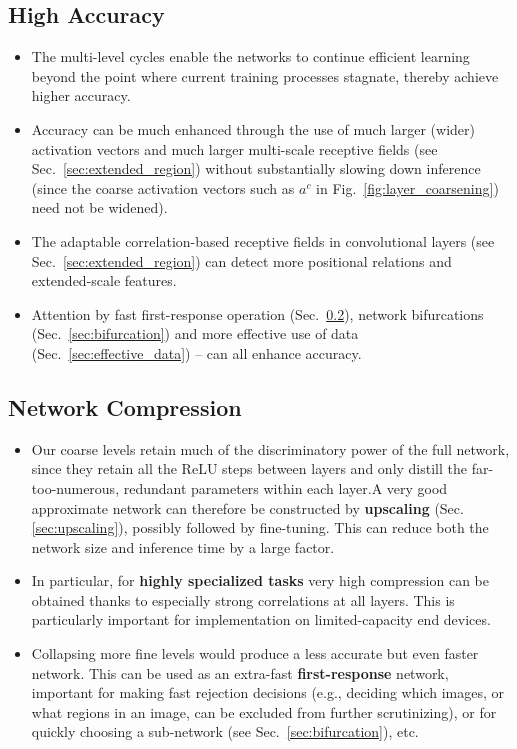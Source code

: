 \documentclass{article} %
\begin{document}
\subsection{High Accuracy}
\label{sec:high_accuracy}
\begin{itemize}
\item The multi-level cycles enable the networks to continue efficient learning beyond the point where current training processes stagnate, thereby achieve higher accuracy.
\item Accuracy can be much enhanced through the use of much larger (wider) activation vectors and much larger multi-scale receptive fields (see Sec.~\ref{sec:extended_region}) without substantially slowing down inference (since the coarse activation vectors such as $a^c$ in Fig.~\ref{fig:layer_coarsening}) need not be widened).
\item The adaptable correlation-based receptive fields in convolutional layers (see Sec.~\ref{sec:extended_region}) can detect more positional relations and extended-scale features.
  \item Attention by fast first-response operation (Sec.~\ref{sec:network_compression}), network bifurcations (Sec.~\ref{sec:bifurcation}) and more effective use of data (Sec.~\ref{sec:effective_data}) -- can all enhance accuracy.
\end{itemize}

\subsection{Network Compression}
\label{sec:network_compression}
\begin{itemize}
\item Our coarse levels retain much of the discriminatory power of the full network, since they retain all the ReLU steps between layers and only distill the far-too-numerous, redundant parameters within each layer.A very good approximate network can therefore be constructed by \textbf{upscaling} (Sec.\ref{sec:upscaling}), possibly followed by fine-tuning. This can reduce both the network size and inference time by a large factor.
\item In particular, for \textbf{highly specialized tasks} very high compression can be obtained thanks to especially strong correlations at all layers. This is particularly important for implementation on limited-capacity end devices.
\item Collapsing more fine levels would produce a less accurate but even faster network. This can be used as an extra-fast \textbf{first-response} network, important for making fast rejection decisions (e.g., deciding which images, or what regions in an image, can be excluded from further scrutinizing), or for quickly choosing a sub-network (see Sec.~\ref{sec:bifurcation}), etc.
\end{itemize}
\end{document}
